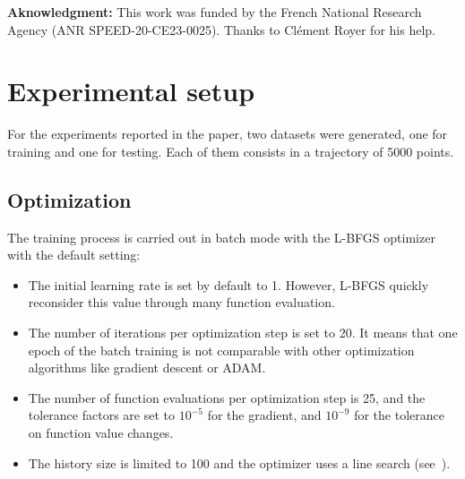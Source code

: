 \documentclass{article}
\begin{document}
\textbf{Aknowledgment:} This work was funded by the French National Research Agency (ANR
SPEED-20-CE23-0025). Thanks to Clément Royer for his help.






\clearpage
\appendix

\section{Experimental setup}
\label{sec:setup}
For the experiments reported in the paper, two datasets were generated, one for training and one for testing. Each
of them consists in a trajectory of 5000 points.




\subsection{Optimization}
\label{ssec:optim}

The training process is carried out in batch mode with  the L-BFGS optimizer with  the default setting: 
\begin{itemize}
\item The initial learning rate is set by default to 1. However,
  L-BFGS quickly reconsider this value through many function
  evaluation.
\item The number of iterations per optimization step is set to 20. It
  means that one epoch of the batch training is not comparable with
  other optimization algorithms like gradient descent or ADAM.
\item   The number  of function evaluations per optimization step is 25, and the tolerance factors are set to $10^{-5}$ for the gradient, and  $10^{-9}$ for the tolerance on function value changes. 
\item The history size is limited to 100 and the optimizer uses a line search (see~\cite{Liu89LBFGS}).
\end{itemize}
\end{document}

